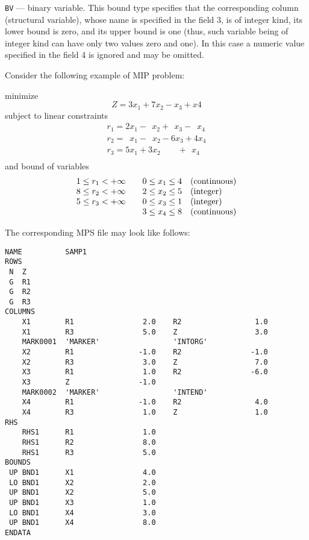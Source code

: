 \verb|BV| --- binary variable. This bound type specifies that the
corresponding column (structural variable), whose name is specified in
the field 3, is of integer kind, its lower bound is zero, and its upper
bound is one (thus, such variable being of integer kind can have only
two values zero and one). In this case a numeric value specified in the
field 4 is ignored and may be omitted.

Consider the following example of MIP problem:

\noindent
\hspace{1in} minimize
$$Z = 3 x_1 + 7 x_2 - x_3 + x4$$
\hspace{1in} subject to linear constraints
$$
\begin{array}{c}
\nonumber r_1 = 2   x_1 - \ \ x_2 + \ \ x_3 - \ \;x_4 \\
\nonumber r_2 = \ \;x_1 - \ \;x_2 - 6   x_3 + 4   x_4 \\
\nonumber r_3 = 5   x_1 +   3 x_2 \ \ \ \ \ \ \ \ \ + \ \ x_4 \\
\end{array}
$$
\hspace{1in} and bound of variables
$$
\begin{array}{cccl}
\nonumber 1 \leq r_1 < +\infty && 0 \leq x_1 \leq 4 &{\rm(continuous)}\\
\nonumber 8 \leq r_2 < +\infty && 2 \leq x_2 \leq 5 &{\rm(integer)}   \\
\nonumber 5 \leq r_3 < +\infty && 0 \leq x_3 \leq 1 &{\rm(integer)}   \\
\nonumber                      && 3 \leq x_4 \leq 8 &{\rm(continuous)}\\
\end{array}
$$

The corresponding MPS file may look like follows:

\newpage

\begin{footnotesize}
\begin{verbatim}
NAME          SAMP1
ROWS
 N  Z
 G  R1
 G  R2
 G  R3
COLUMNS
    X1        R1                2.0    R2                 1.0
    X1        R3                5.0    Z                  3.0
    MARK0001  'MARKER'                 'INTORG'
    X2        R1               -1.0    R2                -1.0
    X2        R3                3.0    Z                  7.0
    X3        R1                1.0    R2                -6.0
    X3        Z                -1.0
    MARK0002  'MARKER'                 'INTEND'
    X4        R1               -1.0    R2                 4.0
    X4        R3                1.0    Z                  1.0
RHS
    RHS1      R1                1.0
    RHS1      R2                8.0
    RHS1      R3                5.0
BOUNDS
 UP BND1      X1                4.0
 LO BND1      X2                2.0
 UP BND1      X2                5.0
 UP BND1      X3                1.0
 LO BND1      X4                3.0
 UP BND1      X4                8.0
ENDATA
\end{verbatim}
\end{footnotesize}

